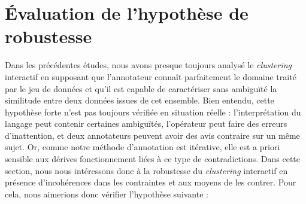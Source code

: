 \section{Évaluation de l'hypothèse de robustesse}
\label{section:4.6-HYPOTHESE-ROBUSTESSE}

	Dans les précédentes études, nous avons presque toujours analysé le \textit{clustering} interactif en supposant que l'annotateur connaît parfaitement le domaine traité par le jeu de données et qu'il est capable de caractériser sans ambiguïté la similitude entre deux données issues de cet ensemble.
	Bien entendu, cette hypothèse forte n'est pas toujours vérifiée en situation réelle : l'interprétation du langage peut contenir certaines ambiguïtés, l'opérateur peut faire des erreurs d'inattention, et deux annotateurs peuvent avoir des avis contraire sur un même sujet.
	Or, comme notre méthode d'annotation est itérative, elle est a priori sensible aux dérives fonctionnement liées à ce type de contradictions.
	Dans cette section, nous nous intéressons donc à la robustesse du \textit{clustering} interactif en présence d'incohérences dans les contraintes et aux moyens de les contrer.
	Pour cela, nous aimerions donc vérifier l'hypothèse suivante :
	
